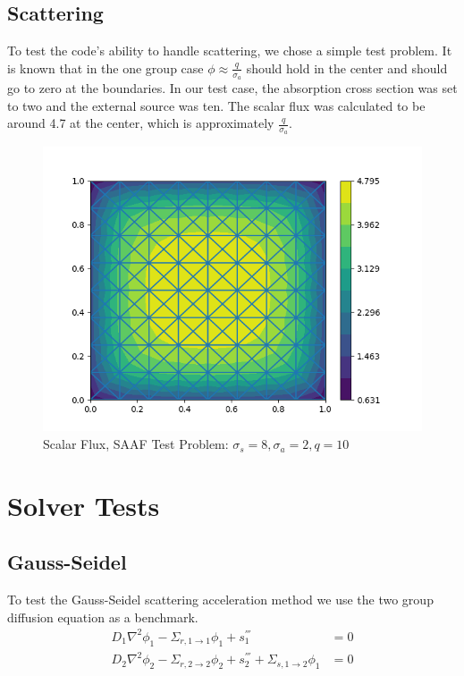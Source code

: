 \subsection{Scattering}
To test the code's ability to handle scattering, we chose a simple test problem. It is known that in the one group case $\phi \approx \frac{q}{\sigma_a}$ should hold in the center and should go to zero at the boundaries. In our test case, the absorption cross section was set to two and the external source was ten. The scalar flux was calculated to be around 4.7 at the center, which is approximately $\frac{q}{\sigma_a}$.
\begin{figure}[H]
    \centering
    \includegraphics[width=\textwidth]{fig/scattering1g_scalar_flux.png}
    \caption{Scalar Flux, SAAF Test Problem: $\sigma_s = 8, \sigma_a = 2, q=10$}
    \label{fig:SAAF_scatter}
\end{figure}

\section{Solver Tests}

\subsection{Gauss-Seidel}
To test the Gauss-Seidel scattering acceleration method we use the two group diffusion equation as a benchmark. 
\begin{align}
 D_1\nabla^2 \phi_1 - \Sigma_{r, 1 \rightarrow 1} \phi_1 + s_1^{'''} &= 0 \\
 D_2\nabla^2 \phi_2 - \Sigma_{r, 2 \rightarrow 2} \phi_2 + s_2^{'''} + \Sigma_{s, 1 \rightarrow 2} \phi_1 &= 0
\end{align}

